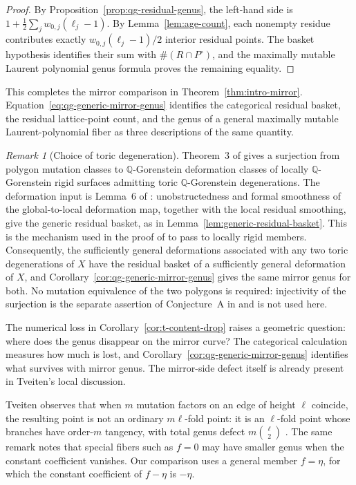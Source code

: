 \documentclass[11pt]{article}
\theoremstyle{plain}
\theoremstyle{definition}
\theoremstyle{remark}
\newtheorem{remark}[theorem]{Remark}
\newcommand{\Q}{\mathbb Q}
\newcommand{\1}{\mathbf 1}
\begin{document}
\begin{proof}
By Proposition~\ref{prop:qg-residual-genus}, the left-hand side is $1+\frac12\sum_jw_{0,j}(\ell_j-1)$.  By Lemma~\ref{lem:age-count}, each nonempty residue contributes exactly $w_{0,j}(\ell_j-1)/2$ interior residual points.  The basket hypothesis identifies their sum with $\#(R\cap P^\circ)$, and the maximally mutable Laurent polynomial genus formula \cite[Theorem 3.13]{CKPT} proves the remaining equality.
\end{proof}

This completes the mirror comparison in Theorem~\ref{thm:intro-mirror}.  Equation~\eqref{eq:qg-generic-mirror-genus} identifies the categorical residual basket, the residual lattice-point count, and the genus of a general maximally mutable Laurent-polynomial fiber as three descriptions of the same quantity.

\begin{remark}[Choice of toric degeneration]\label{rem:choice-of-toric-degeneration}
Theorem~3 of \cite{ACC+} gives a surjection from polygon mutation classes to $\Q$-Gorenstein deformation classes of locally $\Q$-Gorenstein rigid surfaces admitting toric $\Q$-Gorenstein degenerations.  The deformation input is Lemma~6 of \cite{ACC+}: unobstructedness and formal smoothness of the global-to-local deformation map, together with the local residual smoothing, give the generic residual basket, as in Lemma~\ref{lem:generic-residual-basket}.  This is the mechanism used in the proof of \cite[Theorem 3]{ACC+} to pass to locally rigid members.  Consequently, the sufficiently general deformations associated with any two toric degenerations of $X$ have the residual basket of a sufficiently general deformation of $X$, and Corollary~\ref{cor:qg-generic-mirror-genus} gives the same mirror genus for both.  No mutation equivalence of the two polygons is required: injectivity of the surjection is the separate assertion of Conjecture~A in \cite{ACC+} and is not used here.
\end{remark}

The numerical loss in Corollary~\ref{cor:t-content-drop} raises a geometric question: where does the genus disappear on the mirror curve?  The categorical calculation measures how much is lost, and Corollary~\ref{cor:qg-generic-mirror-genus} identifies what survives with mirror genus.  The mirror-side defect itself is already present in Tveiten's local discussion.

Tveiten observes that when $m$ mutation factors on an edge of height $\ell$ coincide, the resulting point is not an ordinary $m\ell$-fold point: it is an $\ell$-fold point whose branches have order-$m$ tangency, with total genus defect $m\binom{\ell}{2}$ \cite[Remark 3.14, arXiv version 2]{Tveiten}.  The same remark notes that special fibers such as $f=0$ may have smaller genus when the constant coefficient vanishes.  Our comparison uses a general member $f=\eta$, for which the constant coefficient of $f-\eta$ is $-\eta$.
\end{document}
